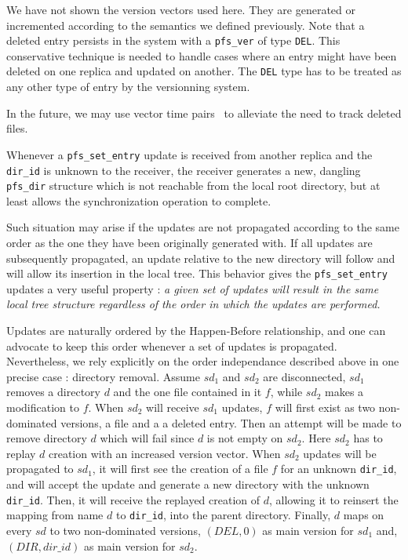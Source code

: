 We have not shown the version vectors used here. They are generated or
incremented according to the semantics we defined previously. Note
that a deleted entry persists in the system with a \texttt{pfs\_ver}
of type {\tt DEL}\@.  This conservative technique is needed to handle
cases where an entry might have been deleted on one replica and
updated on another. The {\tt DEL} type has to be treated as any other
type of entry by the versionning system.


In the future, we may use
vector time pairs~\cite{cox:tra} to alleviate the need to track
deleted files.

Whenever a {\tt pfs\_set\_entry} update is received from another
replica and the {\tt dir\_id} is unknown to the receiver, the receiver
generates a new, dangling {\tt pfs\_dir} structure which is not
reachable from the local root directory, but at least allows the
synchronization operation to complete.

Such situation may arise if the updates are not propagated according
to the same order as the one they have been originally generated
with. If all updates are subsequently propagated, an update relative
to the new directory will follow and will allow its insertion in the
local tree. This behavior gives the {\tt pfs\_set\_entry} updates a
very useful property : \emph{a given set of updates will result in the
same local tree structure regardless of the order in which the updates
are performed.}

Updates are naturally ordered by the Happen-Before relationship, and
one can advocate to keep this order whenever a set of updates is
propagated. Nevertheless, we rely explicitly on the order independance
described above in one precise case : directory removal. Assume
$sd_{1}$ and $sd_{2}$ are disconnected, $sd_{1}$ removes a
directory $d$ and the one file contained in it $f$, while $sd_{2}$
makes a modification to $f$. When $sd_{2}$ will receive $sd_{1}$
updates, $f$ will first exist as two non-dominated versions, a file
and a a deleted entry. Then an attempt will be made to remove
directory $d$ which will fail since $d$ is not empty on $sd_{2}$. Here
$sd_{2}$ has to replay $d$ creation with an increased version
vector. When $sd_{2}$ updates will be propagated to $sd_{1}$, it will
first see the creation of a file $f$ for an unknown {\tt dir\_id}, and
will accept the update and generate a new directory with the unknown
{\tt dir\_id}. Then, it will receive the replayed creation of $d$,
allowing it to reinsert the mapping from name $d$ to {\tt dir\_id}, into
the parent directory. Finally, $d$ maps on every $sd$ to two non-dominated
versions, $(DEL,0)$ as main version for $sd_{1}$ and, $(DIR, dir\_id)$ as main version
for $sd_{2}$.

